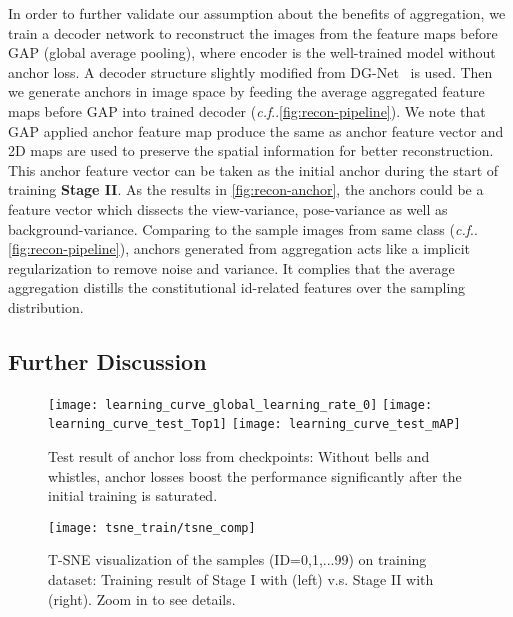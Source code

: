 \documentclass[runningheads]{llncs}
\makeatletter
\DeclareRobustCommand\onedot{\futurelet\@let@token\@onedot}
\def\@onedot{\ifx\@let@token.\else.\null\fi\xspace}
\def\cf{\emph{c.f}\onedot} \def\Cf{\emph{C.f}\onedot}
\makeatother
\begin{document}
In order to further validate our assumption about the benefits of aggregation, we train a decoder network to reconstruct the images from the feature maps before GAP (global average pooling), where encoder is the well-trained model without anchor loss.
A decoder structure slightly modified from DG-Net~\cite{zheng-joint} is used.
Then we generate anchors in image space by feeding the average aggregated feature maps before GAP into trained decoder (\cf \cref{fig:recon-pipeline}).
We note that GAP applied anchor feature map produce the same as anchor feature vector and 2D maps are used to preserve the spatial information for better reconstruction.
This anchor feature vector can be taken as the initial anchor during the start of training \textbf{Stage II}.
As the results in \cref{fig:recon-anchor}, the anchors could be a feature vector which dissects the view-variance, pose-variance as well as background-variance.
Comparing to the sample images from same class (\cf \cref{fig:recon-pipeline}), anchors generated from aggregation acts like a implicit regularization to remove noise and variance.
It complies that the average aggregation distills the constitutional id-related features over the sampling distribution.

\vspace*{-0.18cm}
\subsection{Further Discussion}

\begin{figure}[t]
    \vspace*{-0.38cm}
    \centering
    \texttt{[image: learning\_curve\_global\_learning\_rate\_0]}
    \texttt{[image: learning\_curve\_test\_Top1]}
    \texttt{[image: learning\_curve\_test\_mAP]}
    \vspace*{-0.38cm}
    \caption{Test result of anchor loss from checkpoints: Without bells and whistles, anchor losses boost the performance significantly after the initial training is saturated.}
    \label{fig:learning-curve}
    \vspace*{-0.58cm}
\end{figure}

\begin{figure}[t]
    \centering
    \texttt{[image: tsne\_train/tsne\_comp]}
    \vspace*{-0.58cm}
    \caption{T-SNE visualization of the samples (ID=0,1,...99) on training dataset: Training result of Stage I with  (left) v.s. Stage II with  (right). Zoom in to see details.}
    \label{fig:train-tsne}
    \vspace*{-0.68cm}
\end{figure}
\end{document}
